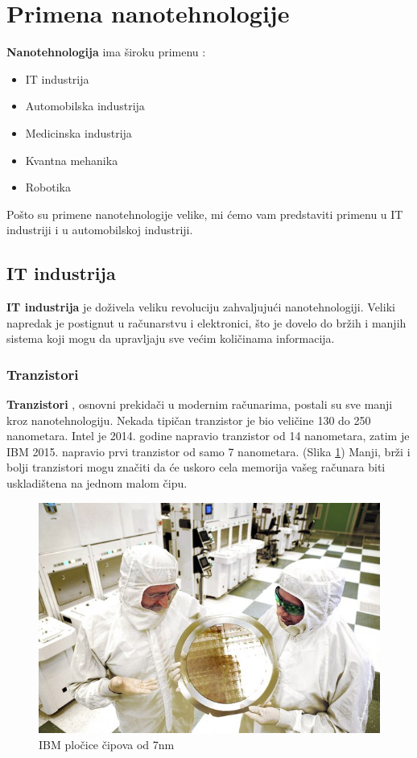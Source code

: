 \documentclass[a4paper]{article}
\begin{document}
{\section{Primena nanotehnologije}
\textbf{Nanotehnologija} ima široku primenu \cite{treciLink}: 
\begin{itemize}
    \item[1] IT industrija
    \item[2] Automobilska industrija
    \item[3] Medicinska industrija 
    \item[4] Kvantna mehanika
    \item[5] Robotika
\end{itemize}

Pošto su primene nanotehnologije velike, mi ćemo vam predstaviti primenu u IT industriji i u automobilskoj industriji.\\


\subsection{IT industrija}

\textbf{IT industrija} je doživela veliku revoluciju zahvaljujući nanotehnologiji. Veliki napredak je postignut u računarstvu i elektronici, što je dovelo do bržih i manjih sistema koji mogu da upravljaju sve većim količinama informacija.\\
\subsubsection{Tranzistori}
\textbf{Tranzistori} \cite{cetvrtiLink}, osnovni prekidači u modernim računarima, postali su sve manji kroz nanotehnologiju. Nekada tipičan tranzistor je bio veličine 130 do 250 nanometara. Intel je 2014. godine napravio tranzistor od 14 nanometara, zatim je IBM 2015. napravio prvi tranzistor od samo 7 nanometara. (Slika \ref{slika_4}) Manji, brži i bolji tranzistori mogu značiti da će uskoro cela memorija vašeg računara biti uskladištena na jednom malom čipu.\\

\begin{figure}[H]
    \centering
    \includegraphics[width=.6\textwidth]{slika 4.jpg}
    \caption{IBM pločice čipova od 7nm}
    \label{slika_4}
\end{figure}

}
\end{document}
